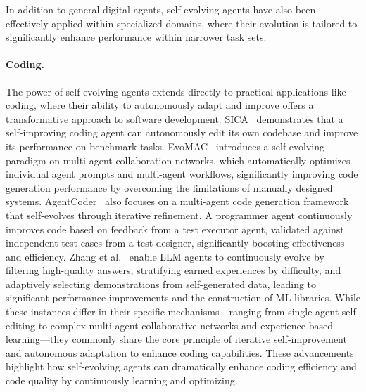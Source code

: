 \documentclass[10pt]{article} %
\begin{document}
In addition to general digital agents, self-evolving agents have also been effectively applied within specialized domains, where their evolution is tailored to significantly enhance performance within narrower task sets. 

\paragraph{Coding.}

The power of self-evolving agents extends directly to practical applications like coding, where their ability to autonomously adapt and improve offers a transformative approach to software development. SICA~\citep{robeyns2025self} demonstrates that a self-improving coding agent can autonomously edit its own codebase and improve its performance on benchmark tasks. EvoMAC~\citep{hu2024self} introduces a self-evolving paradigm on multi-agent collaboration networks, which automatically optimizes individual agent prompts and multi-agent workflows, significantly improving code generation performance by overcoming the limitations of manually designed systems. AgentCoder~\citep{huang2024agentcoder} also focuses on a multi-agent code generation framework that self-evolves through iterative refinement. A programmer agent continuously improves code based on feedback from a test executor agent, validated against independent test cases from a test designer, significantly boosting effectiveness and efficiency. Zhang et al.~\citep{zhang2025adaptive} enable LLM agents to continuously evolve by filtering high-quality answers, stratifying earned experiences by difficulty, and adaptively selecting demonstrations from self-generated data, leading to significant performance improvements and the construction of ML libraries. While these instances differ in their specific mechanisms—ranging from single-agent self-editing to complex multi-agent collaborative networks and experience-based learning—they commonly share the core principle of iterative self-improvement and autonomous adaptation to enhance coding capabilities. 
These advancements highlight how self-evolving agents can dramatically enhance coding efficiency and code quality by continuously learning and optimizing.
\end{document}
